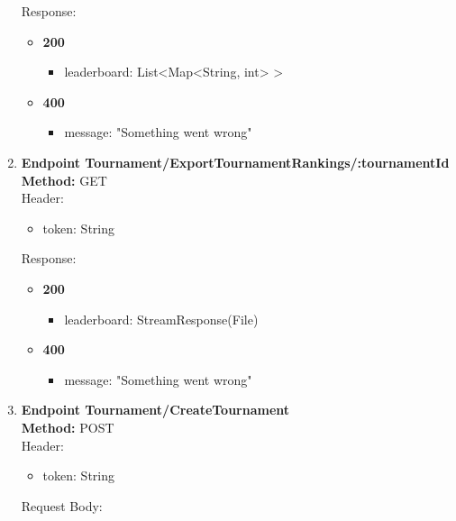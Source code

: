 \begin{enumerate}
    Response:\\
    \begin{itemize}
        \item \textbf{200} \\
        \begin{itemize}
            \item leaderboard: List<Map<String, int> >
        \end{itemize}
        \item \textbf{400} \\
        \begin{itemize}
            \item message: "Something went wrong"
        \end{itemize}
    \end{itemize}
    \item \textbf{Endpoint Tournament/ExportTournamentRankings/:tournamentId} \\
    \textbf{Method:} GET \\
    Header:\\
    \begin{itemize}
        \item token: String
    \end{itemize}
    Response:\\
    \begin{itemize}
        \item \textbf{200} \\
        \begin{itemize}
            \item leaderboard: StreamResponse(File)
        \end{itemize}
        \item \textbf{400} \\
        \begin{itemize}
            \item message: "Something went wrong"
        \end{itemize}
    \end{itemize}
    \item \textbf{Endpoint Tournament/CreateTournament} \\
    \textbf{Method:} POST \\
    Header:\\
    \begin{itemize}
        \item token: String
    \end{itemize}
    Request Body:\\

\end{enumerate}
